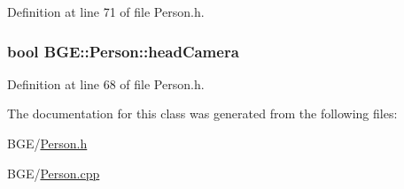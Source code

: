 Definition at line 71 of file Person.\-h.

\hypertarget{class_b_g_e_1_1_person_aa6a0af6c187ab6e33f70e61a9a2e2734}{
\subsubsection[{head\-Camera}]{\setlength{\rightskip}{0pt plus 5cm}bool B\-G\-E\-::\-Person\-::head\-Camera}}\label{class_b_g_e_1_1_person_aa6a0af6c187ab6e33f70e61a9a2e2734}


Definition at line 68 of file Person.\-h.



The documentation for this class was generated from the following files\-:\begin{DoxyCompactItemize}
\item 
B\-G\-E/\hyperlink{_person_8h}{Person.\-h}\item 
B\-G\-E/\hyperlink{_person_8cpp}{Person.\-cpp}\end{DoxyCompactItemize}

